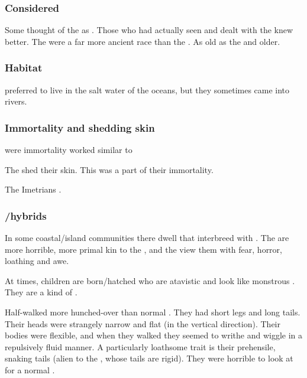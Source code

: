 \subsubsection{Considered \demiscathae}
Some thought of the \nagae as .
Those who had actually seen and dealt with the \nagae knew better.
The \nagae were a far more ancient race than the \scathae. 
As old as the \dragons and older. 





\subsubsection{Habitat}
\Nagae preferred to live in the salt water of the oceans, but they sometimes came into rivers. 





\subsubsection{Immortality and shedding skin}
\Nagae were 
\Naga immortality worked similar to 

The \nagae shed their skin.
This was a part of their immortality. 

The Imetrians . 





\subsubsection[Scatha/Naga hybrids]{\Scatha/\naga hybrids}
In some coastal/island communities there dwell \scathae{} that interbreed with \nagae{}. 
The \nagae{} are more horrible, more primal kin to the \scathae, and the \scathae{} view them with fear, horror, loathing and awe. 

At times, children are born/hatched who are atavistic and look like monstrous \nagae. 
They are a kind of . 

Half-\nagae walked more hunched-over than normal \scathae.
They had short legs and long tails. 
Their heads were strangely narrow and flat (in the vertical direction). 
Their bodies were flexible, and when they walked they seemed to writhe and wiggle in a repulsively fluid manner.
A particularly loathsome trait is their prehensile, snaking tails (alien to the \scathae, whose tails are rigid).
They were horrible to look at for a normal \scatha.

